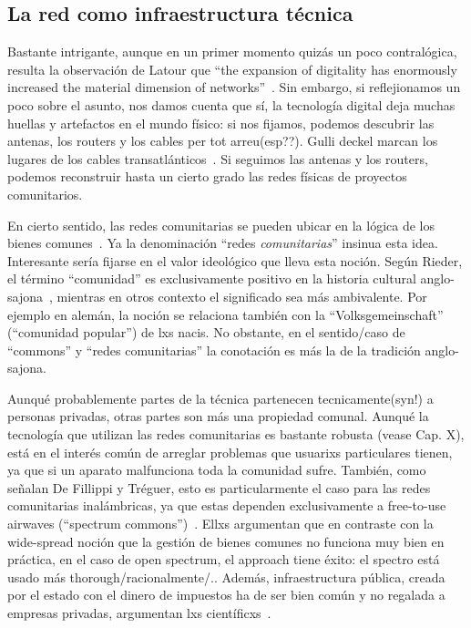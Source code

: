 \subsection{La red como infraestructura técnica}

Bastante intrigante, aunque en un primer momento quizás un poco contralógica, resulta la observación de Latour que ``the expansion of digitality has enormously increased the material dimension of networks''~\autocite{Latour2010}.
Sin embargo, si reflejionamos un poco sobre el asunto, nos damos cuenta que sí, la tecnología digital deja muchas huellas y artefactos en el mundo físico: si nos fijamos, podemos descubrir las antenas, los routers y los cables per tot arreu(esp??).
Gulli deckel marcan los lugares de los cables transatlánticos~\autocite{video-internet-landscapes}.
Si seguimos las antenas y los routers, podemos reconstruir hasta un cierto grado las redes físicas de proyectos comunitarios.

En cierto sentido, las redes comunitarias se pueden ubicar en la lógica de los bienes comunes~\autocite{FiTre2015}.
Ya la denominación ``redes \textit{comunitarias}'' insinua esta idea.
Interesante sería fijarse en el valor ideológico que lleva esta noción.
Según Rieder, el término ``comunidad'' es exclusivamente positivo en la historia cultural anglo-sajona~\autocite{Rieder2012}, mientras en otros contexto el significado sea más ambivalente.
Por ejemplo en alemán, la noción se relaciona también con la ``Volksgemeinschaft'' (``comunidad popular'') de lxs nacis. %
No obstante, en el sentido/caso de ``commons'' y ``redes comunitarias'' la conotación es más la de la tradición anglo-sajona.

Aunqué probablemente partes de la técnica partenecen tecnicamente(syn!) a personas privadas, otras partes son más una propiedad comunal.
Aunqué la tecnología que utilizan las redes comunitarias es bastante robusta (vease Cap. X), está en el interés común de arreglar problemas que usuarixs particulares tienen, ya que si un aparato malfunciona toda la comunidad sufre.
También, como señalan De Fillippi y Tréguer, esto es particularmente el caso para las redes comunitarias inalámbricas, ya que estas dependen exclusivamente a free-to-use airwaves (``spectrum commons'')~\autocite{FiTre2015}.
Ellxs argumentan que en contraste con la wide-spread noción que la gestión de bienes comunes no funciona muy bien en práctica, en el caso de open spectrum, el approach tiene éxito:
el spectro está usado más thorough/racionalmente/..
Además, infraestructura pública, creada por el estado con el dinero de impuestos ha de ser bien común y no regalada a empresas privadas, argumentan lxs científicxs~\autocite{FiTre2015}.

